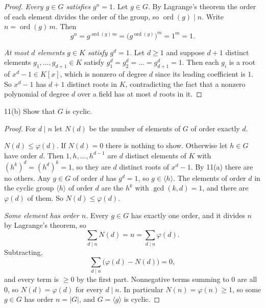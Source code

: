 \documentclass[11pt]{article}
\begin{document}
\begin{proof}
\emph{Every $g \in G$ satisfies $g^n = 1$.} Let $g \in G$. By Lagrange's
theorem the order of each element divides the order of the group, so
$\operatorname{ord}(g) \mid n$. Write $n = \operatorname{ord}(g)\, m$. Then
\[
  g^n = g^{\operatorname{ord}(g)\, m} = \bigl(g^{\operatorname{ord}(g)}\bigr)^m
  = 1^m = 1.
\]

\emph{At most $d$ elements $g \in K$ satisfy $g^d = 1$.} Let $d \geq 1$ and
suppose $d+1$ distinct elements $g_1, \dots, g_{d+1} \in K$ satisfy
$g_1^d = g_2^d = \dots = g_{d+1}^d = 1$. Then each $g_i$ is a root of
$x^d - 1 \in K[x]$, which is nonzero of degree $d$ since its leading
coefficient is $1$. So $x^d - 1$ has $d+1$ distinct roots in $K$, contradicting
the fact that a nonzero polynomial of degree $d$ over a field has at most $d$
roots in it.
\end{proof}

\begin{problem}{11(b)}
  Show that $G$ is cyclic.
\end{problem}

\begin{proof}
For $d \mid n$ let $N(d)$ be the number of elements of $G$ of order exactly $d$.

\emph{$N(d) \leq \varphi(d)$.} If $N(d) = 0$ there is nothing to show. Otherwise
let $h \in G$ have order $d$. Then $1, h, \dots, h^{d-1}$ are $d$ distinct
elements of $K$ with $(h^k)^d = (h^d)^k = 1$, so they are $d$ distinct roots of
$x^d - 1$. By 11(a) there are no others. Any $g \in G$ of order $d$ has
$g^d = 1$, so $g \in \langle h \rangle$. The elements of order $d$ in the
cyclic group $\langle h \rangle$ of order $d$ are the $h^k$ with
$\gcd(k, d) = 1$, and there are $\varphi(d)$ of them. So $N(d) \leq \varphi(d)$.

\emph{Some element has order $n$.} Every $g \in G$ has exactly one order, and it
divides $n$ by Lagrange's theorem, so
\[
  \sum_{d \mid n} N(d) = n = \sum_{d \mid n} \varphi(d).
\]
Subtracting,
\[
  \sum_{d \mid n} \bigl(\varphi(d) - N(d)\bigr) = 0,
\]
and every term is $\geq 0$ by the first part. Nonnegative terms summing to $0$
are all $0$, so $N(d) = \varphi(d)$ for every $d \mid n$. In particular
$N(n) = \varphi(n) \geq 1$, so some $g \in G$ has order $n = |G|$, and
$G = \langle g \rangle$ is cyclic.
\end{proof}
\end{document}
